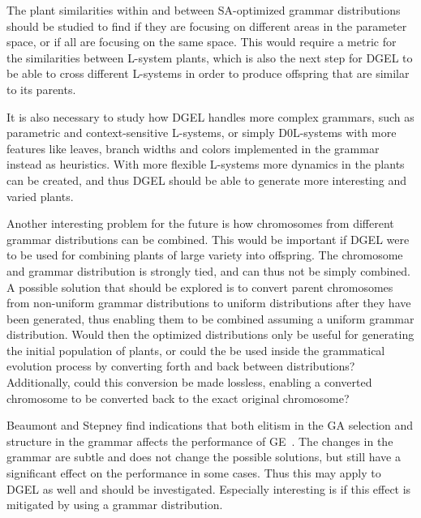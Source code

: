 The plant similarities within and between \gls{SA}-optimized grammar distributions should be studied to find if they are focusing on different areas in the parameter space, or if all are focusing on the same space.
This would require a metric for the similarities between \gls{L-system} plants, which is also the next step for \gls{DGEL} to be able to cross different \glspl{L-system} in order to produce offspring that are similar to its parents.

It is also necessary to study how \gls{DGEL} handles more complex grammars, such as parametric and context-sensitive \glspl{L-system}, or simply D0L-systems with more features like leaves, branch widths and colors implemented in the grammar instead as heuristics.
With more flexible \glspl{L-system} more dynamics in the plants can be created, and thus \gls{DGEL} should be able to generate more interesting and varied plants.

Another interesting problem for the future is how chromosomes from different grammar distributions can be combined.
This would be important if \gls{DGEL} were to be used for combining plants of large variety into offspring.
The chromosome and grammar distribution is strongly tied, and can thus not be simply combined.
A possible solution that should be explored is to convert parent chromosomes from non-uniform grammar distributions to uniform distributions after they have been generated, thus enabling them to be combined assuming a uniform grammar distribution.
Would then the optimized distributions only be useful for generating the initial population of plants, or could the be used inside the grammatical evolution process by converting forth and back between distributions?
Additionally, could this conversion be made lossless, enabling a converted chromosome to be converted back to the exact original chromosome?

Beaumont and Stepney find indications that both elitism in the \gls{GA} selection and structure in the grammar affects the performance of \gls{GE}~\cite{2009Beaumont}.
The changes in the grammar are subtle and does not change the possible solutions, but still have a significant effect on the performance in some cases.
Thus this may apply to \gls{DGEL} as well and should be investigated.
Especially interesting is if this effect is mitigated by using a grammar distribution.
